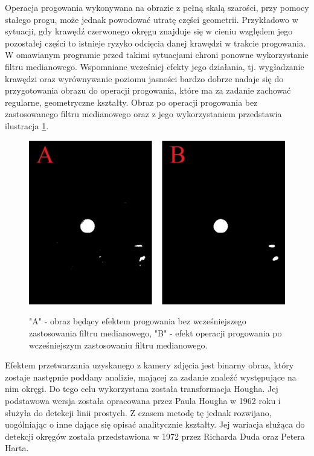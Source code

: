 Operacja progowania wykonywana na obrazie z pełną skalą szarości, przy pomocy stałego progu, może jednak powodować utratę części geometrii. Przykładowo w sytuacji, gdy krawędź czerwonego okręgu znajduje się w cieniu względem jego pozostałej części to istnieje ryzyko odcięcia danej krawędzi w trakcie progowania. W omawianym programie przed takimi sytuacjami chroni ponowne wykorzystanie filtru medianowego. Wspomniane wcześniej efekty jego działania, tj. wygładzanie krawędzi oraz wyrównywanie poziomu jasności bardzo dobrze nadaje się do przygotowania obrazu do operacji progowania, które ma za zadanie zachować regularne, geometryczne kształty. Obraz po operacji progowania bez zastosowanego filtru medianowego oraz z jego wykorzystaniem przedstawia ilustracja \ref{threshold}.
\begin{figure}[H]
\begin{center}
\includegraphics[scale=0.42]{imgs/threshold.jpg}
\caption[Efekt progowania z oraz bez filtru medianowego.]\small{"A" - obraz będący efektem progowania bez wcześniejszego zastosowania filtru medianowego, "B" - efekt operacji progowania po wcześniejszym zastosowaniu filtru medianowego.}
\label{threshold}
\end{center}
\end{figure}

Efektem przetwarzania uzyskanego z kamery zdjęcia jest binarny obraz, który zostaje następnie poddany analizie, mającej za zadanie znaleźć występujące na nim okręgi. Do tego celu wykorzystana została transformacja Hougha. Jej podstawowa wersja została opracowana przez Paula Hougha w 1962 roku i służyła do detekcji linii prostych. Z czasem metodę tę jednak rozwijano, uogólniając o inne dające się opisać analitycznie kształty. Jej wariacja służąca do detekcji okręgów została przedstawiona w 1972 przez Richarda Duda oraz Petera Harta.

